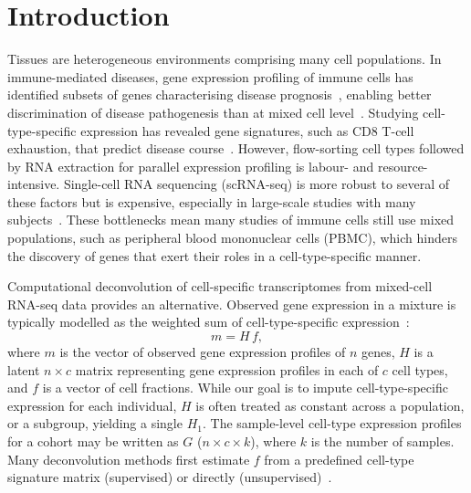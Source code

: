 \documentclass[11pt]{article}
\begin{document}
\section{Introduction}
Tissues are heterogeneous environments comprising many cell populations. In immune-mediated diseases, gene expression profiling of immune cells has identified subsets of genes characterising disease prognosis~\citep{avila2020immune,avilapedretti2021jia}, enabling better discrimination of disease pathogenesis than at mixed cell level~\citep{avila2019treatment}. Studying cell-type-specific expression has revealed gene signatures, such as CD8 T-cell exhaustion, that predict disease course~\citep{mahnke2013cd8exhaustion}. However, flow-sorting cell types followed by RNA extraction for parallel expression profiling is labour- and resource-intensive. Single-cell RNA sequencing (scRNA-seq) is more robust to several of these factors but is expensive, especially in large-scale studies with many subjects~\citep{stoeckius2017citeseq,mcdavid2019scrnacost}. These bottlenecks mean many studies of immune cells still use mixed populations, such as peripheral blood mononuclear cells (PBMC), which hinders the discovery of genes that exert their roles in a cell-type-specific manner.

Computational deconvolution of cell-specific transcriptomes from mixed-cell RNA-seq data provides an alternative. Observed gene expression in a mixture is typically modelled as the weighted sum of cell-type-specific expression~\citep{newman2015cibersort,shen2010cssam,macparland2018scrna}:
\begin{equation}
m = H \, f,
\end{equation}
where $m$ is the vector of observed gene expression profiles of $n$ genes, $H$ is a latent $n \times c$ matrix representing gene expression profiles in each of $c$ cell types, and $f$ is a vector of cell fractions. While our goal is to impute cell-type-specific expression for each individual, $H$ is often treated as constant across a population, or a subgroup, yielding a single $H_1$. The sample-level cell-type expression profiles for a cohort may be written as $G$ ($n \times c \times k$), where $k$ is the number of samples. Many deconvolution methods first estimate $f$ from a predefined cell-type signature matrix (supervised) or directly (unsupervised)~\citep{racle2017epic,finotello2019quantiseq,hao2019fardeep,newman2015cibersort,wang2016debcam}.
\end{document}
